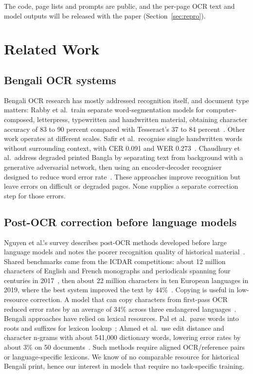 \documentclass[conference]{IEEEtran}
\begin{document}
The code, page lists and prompts are public, and the per-page OCR text and model outputs will be released with the paper (Section~\ref{sec:repro}).

\section{Related Work}

\subsection{Bengali OCR systems}
Bengali OCR research has mostly addressed recognition itself, and document type matters: Rabby et al.\ train separate word-segmentation models for computer-composed, letterpress, typewritten and handwritten material, obtaining character accuracy of 83 to 90 percent compared with Tesseract's 37 to 84 percent~\cite{rabby2024enhancement}. Other work operates at different scales. Safir et al.\ recognise single handwritten words without surrounding context, with CER 0.091 and WER 0.273~\cite{safir2021endtoend}. Chaudhury et al.\ address degraded printed Bangla by separating text from background with a generative adversarial network, then using an encoder-decoder recogniser designed to reduce word error rate~\cite{chaudhury2022deep}. These approaches improve recognition but leave errors on difficult or degraded pages. None supplies a separate correction step for those errors.

\subsection{Post-OCR correction before language models}
Nguyen et al.'s survey describes post-OCR methods developed before large language models and notes the poorer recognition quality of historical material~\cite{nguyen2021survey}. Shared benchmarks came from the ICDAR competitions: about 12 million characters of English and French monographs and periodicals spanning four centuries in 2017~\cite{chiron2017icdar}, then about 22 million characters in ten European languages in 2019, where the best system improved the text by 44\%~\cite{rigaud2019icdar}. Copying is useful in low-resource correction. A model that can copy characters from first-pass OCR reduced error rates by an average of 34\% across three endangered languages~\cite{rijhwani2020ocr}. Bengali approaches have relied on lexical resources. Pal et al.\ parse words into roots and suffixes for lexicon lookup~\cite{pal2000ocr}; Ahmed et al.\ use edit distance and character n-grams with about 541{,}000 dictionary words, lowering error rates by about 3\% on 50 documents~\cite{ahmed2016improving}. Such methods require aligned OCR/reference pairs or language-specific lexicons. We know of no comparable resource for historical Bengali print, hence our interest in models that require no task-specific training.
\end{document}

